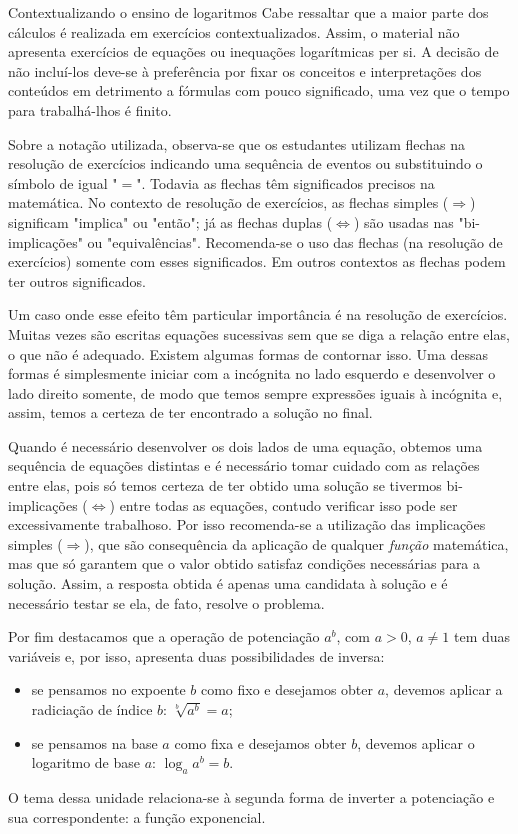 \begin{apresentacao}{Contextualizando o ensino de logaritmos}
Cabe ressaltar que a maior parte dos cálculos é realizada em exercícios contextualizados. Assim, o material não apresenta exercícios de equações ou inequações logarítmicas per si. A decisão de não incluí-los deve-se à preferência por fixar os conceitos e interpretações dos conteúdos em detrimento a fórmulas com pouco significado, uma vez que o tempo para trabalhá-lhos é finito.

Sobre a notação utilizada, observa-se que os estudantes utilizam flechas na resolução de exercícios indicando uma sequência de eventos ou substituindo o símbolo de igual "$=$". Todavia as flechas têm significados precisos na matemática. No contexto de resolução de exercícios, as flechas simples ($\Longrightarrow$) significam "implica" ou "então"; já as flechas duplas ($\Longleftrightarrow$) são usadas nas "bi-implicações" ou "equivalências". Recomenda-se o uso das flechas (na resolução de exercícios) somente com esses significados. Em outros contextos as flechas podem ter outros significados.

Um caso onde esse efeito têm particular importância é na resolução de exercícios. Muitas vezes são escritas equações sucessivas sem que se diga a relação entre elas, o que não é adequado. Existem algumas formas de contornar isso. Uma dessas formas é simplesmente iniciar com a incógnita no lado esquerdo e desenvolver o lado direito somente, de modo que temos sempre expressões iguais à incógnita e, assim, temos a certeza de ter encontrado a solução no final.

Quando é necessário desenvolver os dois lados de uma equação, obtemos uma sequência de equações distintas e é necessário tomar cuidado com as relações entre elas, pois só temos certeza de ter obtido uma solução se tivermos bi-implicações ($\Longleftrightarrow$) entre todas as equações, contudo verificar isso pode ser excessivamente trabalhoso. Por isso recomenda-se a utilização das implicações simples ($\Rightarrow$), que são consequência da aplicação de qualquer \textit{função} matemática, mas que só garantem que o valor obtido satisfaz condições necessárias para a solução. Assim, a resposta obtida é apenas uma candidata à solução e é necessário testar se ela, de fato, resolve o problema.

Por fim destacamos que a operação de potenciação $a^b$, com $a>0$, $a\neq 1$ tem duas variáveis e, por isso, apresenta duas possibilidades de inversa:
\begin{itemize}
\item se pensamos no expoente $b$ como fixo e desejamos obter $a$, devemos aplicar a radiciação de índice $b$: $\sqrt[b]{a^b}=a$;
\item se pensamos na base $a$ como fixa e desejamos obter $b$, devemos aplicar o logaritmo de base $a$: $\log_a a^b =b$.
\end{itemize}
O tema dessa unidade relaciona-se à segunda forma de inverter a potenciação e sua correspondente: a função exponencial.
\end{apresentacao}

